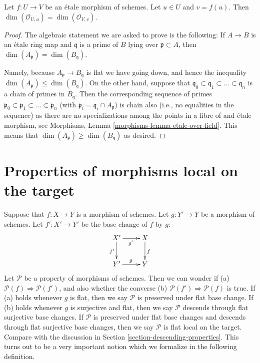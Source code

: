 \begin{lemma}
\label{lemma-dimension-local-ring-local}
Let $f : U \to V$ be an \'etale morphism of schemes.
Let $u \in U$ and $v = f(u)$. Then
$\dim(\mathcal{O}_{U, u}) = \dim(\mathcal{O}_{V, v})$.
\end{lemma}

\begin{proof}
The algebraic statement we are asked to prove is the following:
If $A \to B$ is an \'etale ring map and $\mathfrak q$ is a prime of
$B$ lying over $\mathfrak p \subset A$, then
$\dim(A_{\mathfrak p}) = \dim(B_{\mathfrak q})$.

\medskip\noindent
Namely, because $A_{\mathfrak p} \to B_{\mathfrak q}$ is flat we have
going down, and hence the inequality
$\dim(A_{\mathfrak p}) \leq \dim(B_{\mathfrak q})$.
On the other hand, suppose that
$\mathfrak q_0 \subset \mathfrak q_1 \subset \ldots \subset \mathfrak q_n$
is a chain of primes in $B_{\mathfrak q}$. Then the corresponding
sequence of primes
$\mathfrak p_0 \subset \mathfrak p_1 \subset \ldots \subset \mathfrak p_n$
(with $\mathfrak p_i = \mathfrak q_i \cap A_{\mathfrak p}$) is chain
also (i.e., no equalities in the sequence) as there are no specializations
among the points in a fibre of and \'etale morphism, see
Morphisms, Lemma \ref{morphisms-lemma-etale-over-field}.
This means that $\dim(A_{\mathfrak p}) \geq \dim(B_{\mathfrak q})$ as
desired.
\end{proof}








\section{Properties of morphisms local on the target}
\label{section-descending-properties-morphisms}

\noindent
Suppose that $f : X \to Y$ is a morphism of schemes.
Let $g : Y' \to Y$ be a morphism of schemes.
Let $f' : X' \to Y'$ be the base change of $f$ by $g$:
$$
\xymatrix{
X' \ar[d]_{f'} \ar[r]_{g'} & X \ar[d]^f \\
Y' \ar[r]^g & Y
}
$$
Let $\mathcal{P}$ be a property of morphisms of schemes.
Then we can wonder if (a) $\mathcal{P}(f) \Rightarrow \mathcal{P}(f')$,
and also whether the converse (b) $\mathcal{P}(f') \Rightarrow \mathcal{P}(f)$
is true. If (a) holds whenever $g$ is flat, then we say $\mathcal{P}$
is preserved under flat base change. If (b) holds whenever $g$ is
surjective and flat, then we say $\mathcal{P}$ descends through
flat surjective base changes. If $\mathcal{P}$ is preserved under
flat base changes and descends through flat surjective base changes,
then we say $\mathcal{P}$ is flat local on the target.
Compare with the discussion in
Section \ref{section-descending-properties}.
This turns out to be a very important notion which
we formalize in the following definition.

